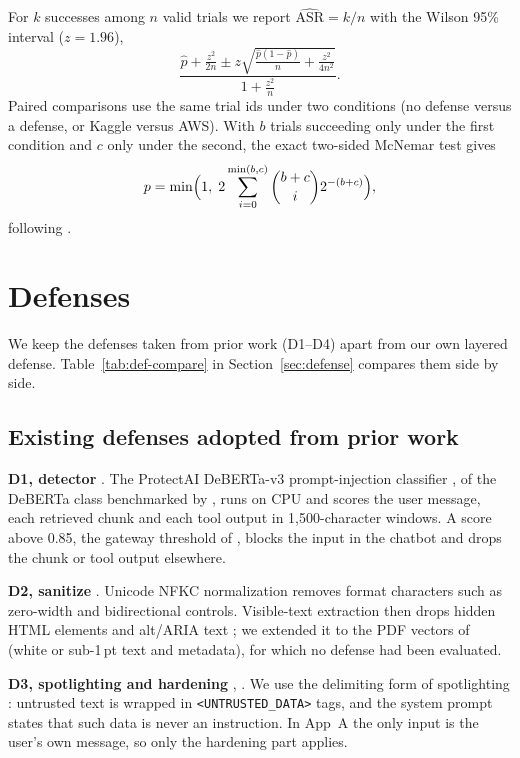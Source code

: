 \documentclass[a4paper,fleqn]{cas-dc}
\begin{document}
For $k$ successes among $n$ valid trials we report $\widehat{\mathrm{ASR}} = k/n$ with the Wilson 95\% interval ($z = 1.96$),
\begin{equation}
\frac{\hat p + \frac{z^2}{2n} \pm z\sqrt{\frac{\hat p(1-\hat p)}{n} + \frac{z^2}{4n^2}}}{1 + \frac{z^2}{n}} .
\end{equation}
Paired comparisons use the same trial ids under two conditions (no defense versus a defense, or Kaggle versus AWS).
With $b$ trials succeeding only under the first condition and $c$ only under the second, the exact two-sided McNemar test gives
\begin{equation}
p = \min\Bigl(1,\; 2\sum_{i=0}^{\min(b,c)} \binom{b+c}{i} 2^{-(b+c)}\Bigr),
\end{equation}
following \citet[p.~4]{P10}.

\section{Defenses}\label{sec:defenses}
We keep the defenses taken from prior work (D1--D4) apart from our own layered defense.
Table~\ref{tab:def-compare} in Section~\ref{sec:defense} compares them side by side.

\subsection{Existing defenses adopted from prior work}
\textbf{D1, detector} \citep{P03,P06,protectai}.
The ProtectAI DeBERTa-v3 prompt-injection classifier \citep{protectai}, of the DeBERTa class benchmarked by \citet{P03}, runs on CPU and scores the user message, each retrieved chunk and each tool output in 1{,}500-character windows.
A score above 0.85, the gateway threshold of \citet[p.~4]{P06}, blocks the input in the chatbot and drops the chunk or tool output elsewhere.

\textbf{D2, sanitize} \citep[p.~3]{P04}.
Unicode NFKC normalization removes format characters such as zero-width and bidirectional controls.
Visible-text extraction then drops hidden HTML elements and alt/ARIA text \citep[p.~3]{P04}; we extended it to the PDF vectors of \citet[p.~3]{P13} (white or sub-1\,pt text and metadata), for which no defense had been evaluated.

\textbf{D3, spotlighting and hardening} \citep{hines2024}, \citep[p.~10]{P05}.
We use the delimiting form of spotlighting \citep{hines2024}: untrusted text is wrapped in \texttt{<UNTRUSTED\_DATA>} tags, and the system prompt states that such data is never an instruction.
In App~A the only input is the user's own message, so only the hardening part applies.
\end{document}

